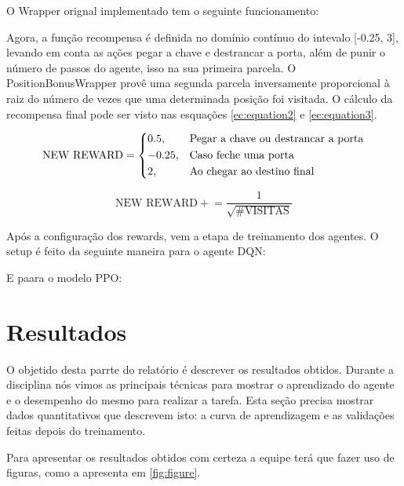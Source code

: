 \documentclass[9pt,a4paper,twoside]{tau}
\begin{document}
O Wrapper orignal implementado tem o seguinte funcionamento:


Agora, a função recompensa é definida no domínio contínuo do intevalo [-0.25, 3], levando em conta as ações pegar a chave e destrancar a porta, além de punir o número de passos do agente, isso na sua primeira parcela. O PositionBonusWrapper provê uma segunda parcela inversamente proporcional à raiz do número de vezes que uma determinada posição foi visitada. O cálculo da recompensa final pode ser visto nas esquações \ref{ec:equation2} e \ref{ec:equation3}.

\begin{equation}
    \label{ec:equation2}
    \text{NEW REWARD} =
    \begin{dcases}
        0.5,                        & \text{Pegar a chave ou destrancar a porta}     \\
        -0.25,                      & \text{Caso feche uma porta}                       \\
        2,                          & \text{Ao chegar ao destino final}
    \end{dcases}
\end{equation}

\begin{equation}
    \label{ec:equation3}
   \text{NEW REWARD} +\!= \frac{1}{\sqrt{\text{\#VISITAS}}}
\end{equation}

Após a configuração dos rewards, vem a etapa de treinamento dos agentes. O setup é feito da seguinte maneira para o agente DQN:

E paara o modelo PPO:


\section{Resultados}

O objetido desta parrte do relatório é descrever os resultados obtidos. Durante a disciplina nós vimos as principais técnicas para mostrar o aprendizado do agente e o desempenho do mesmo para realizar a tarefa. Esta seção precisa mostrar dados quantitativos que descrevem isto: a curva de aprendizagem e as validações feitas depois do treinamento.

Para apresentar os resultados obtidos com certeza a equipe terá que fazer uso de figuras, como a apresenta em \ref{fig:figure}.
\end{document}
